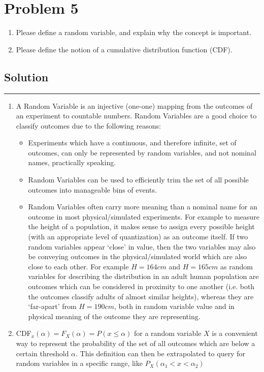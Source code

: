 \section{Problem 5}
\begin{enumerate}[5a.]
	\item Please define a random variable, and explain why the concept is important.
	\item Please define the notion of a cumulative distribution function (CDF).
\end{enumerate}

\subsection{Solution}

\noindent\rule{\textwidth}{1pt}
\begin{enumerate}[5a.]
	\item A Random Variable is an injective (one-one) mapping from the outcomes of an experiment to countable numbers. Random Variables are a good choice to classify outcomes due to the following reasons:
		\begin{itemize}
			\item Experiments which have a continuous, and therefore infinite, set of outcomes, can only be represented by random variables, and not nominal names, practically speaking.
			\item Random Variables can be used to efficiently trim the set of all possible outcomes into manageable bins of events.
			\item Random Variables often carry more meaning than a nominal name for an outcome in most physical/simulated experiments. For example to measure the height of a population, it makes sense to assign every possible height (with an appropriate level of quantization) as an outcome itself. If two random variables appear `close' in value, then the two variables may also be conveying outcomes in the physical/simulated world which are also close to each other. For example $H=164cm$ and $H=165cm$ as random variables for describing the distribution in an adult human population are outcomes which can be considered in proximity to one another (i.e. both the outcomes classify adults of almost similar heights), whereas they are `far-apart' from $H=190cm$, both in random variable value and in physical meaning of the outcome they are representing.
		\end{itemize} 
	\item CDF$_x(\alpha) = F_X(\alpha) = P(x \leq \alpha)$ for a random variable $X$ is a convenient way to represent the probability of the set of all outcomes which are below a certain threshold $\alpha$. This definition can then be extrapolated to query for random variables in a specific range, like $P_X(\alpha_1 < x < \alpha_2)$\\

\end{enumerate}
